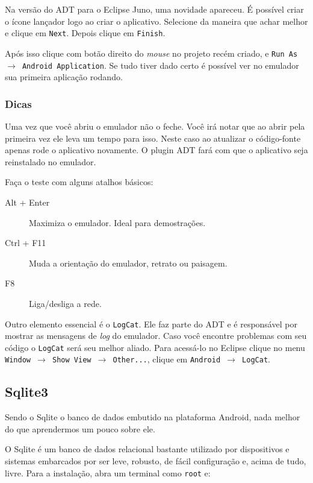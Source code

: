 Na versão do ADT para o Eclipse Juno, uma novidade apareceu. É possível criar o ícone lançador logo ao criar
o aplicativo. Selecione da maneira que achar melhor e clique em \texttt{Next}. Depois clique em \texttt{Finish}.

Após isso clique com botão direito do \textit{mouse} no projeto recém criado, e \texttt{Run As $\rightarrow$
Android Application}. Se tudo tiver dado certo é possível ver no emulador sua primeira aplicação
rodando.

\subsubsection{Dicas}

Uma vez que você abriu o emulador não o feche. Você irá notar que ao abrir
pela primeira vez ele leva um tempo para isso. Neste caso ao atualizar o código-fonte apenas
rode o aplicativo novamente. O plugin ADT fará com que o aplicativo seja reinstalado no emulador.

Faça o teste com alguns atalhos básicos:
\begin{description}
	\item[Alt + Enter] Maximiza o emulador. Ideal para demostrações.
	\item[Ctrl + F11] Muda a orientação do emulador, retrato ou paisagem.
	\item[F8] Liga/desliga a rede.
\end{description}

Outro elemento essencial é o \texttt{LogCat}. Ele faz parte do ADT e é responsável por mostrar
as mensagens de \textit{log} do emulador. Caso você encontre problemas com seu código o \texttt{LogCat}
será seu melhor aliado. Para acessá-lo no Eclipse clique no menu \texttt{Window $\rightarrow$ Show View
$\rightarrow$ Other...}, clique em \texttt{Android $\rightarrow$ LogCat}.

\subsection{Sqlite3}

Sendo o Sqlite o banco de dados embutido na plataforma Android, nada melhor do que aprendermos um pouco
sobre ele.

O Sqlite é um banco de dados relacional bastante utilizado por dispositivos e sistemas embarcados por
ser leve, robusto, de fácil configuração e, acima de tudo, livre. Para a instalação, abra um terminal
como \texttt{root} e:

